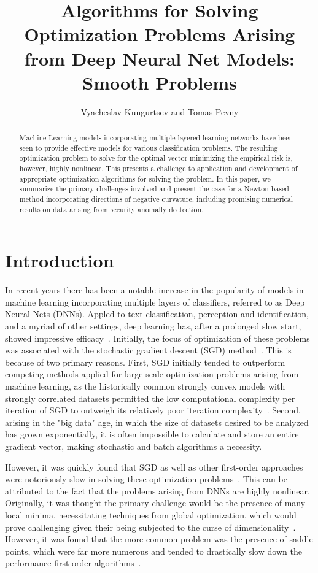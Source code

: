 \documentclass[psamsfonts,onesided,10pt]{amsart}
\title{Algorithms for Solving Optimization Problems Arising from Deep Neural Net Models: Smooth Problems}
\author{Vyacheslav Kungurtsev and Tomas Pevny}
\theoremstyle{definition}
\theoremstyle{remark}
\numberwithin{equation}{section}
\begin{document}
\maketitle


\begin{abstract}
Machine Learning models incorporating multiple layered learning networks have been seen to provide effective
models for various classification problems. The resulting optimization problem to solve for the optimal vector
minimizing the empirical risk is, however, highly nonlinear. This presents a challenge to application and development
of appropriate optimization algorithms for solving the problem. In this paper, we summarize the primary challenges
involved and present the case for a Newton-based method incorporating directions of negative curvature, including
promising numerical results on data arising from security anomally deetection. 
\end{abstract}

\section{Introduction}
In recent years there has been a notable increase in the popularity of models in machine learning incorporating multiple 
layers of classifiers, referred to as Deep Neural Nets (DNNs). 
Appled to text classification, perception and identification, and a myriad of other settings, deep learning
has, after a prolonged slow start, showed impressive efficacy~\cite{lecun2015deep}. Initially, the focus of optimization of these
problems was associated with the stochastic gradient descent (SGD) method~\cite{robbins1951stochastic}. This is because of two primary reasons.
First, SGD initially tended to outperform competing methods applied for large scale optimization problems arising from machine learning, 
as the historically common strongly convex models with strongly correlated
datasets permitted the low computational complexity per iteration of SGD to outweigh its relatively poor iteration complexity~\cite{bottou2016optimization}.  
Second, arising in the "big data" age, in which the size of datasets desired to be analyzed has grown exponentially, it is often impossible to calculate
and store an entire gradient vector, making stochastic and batch algorithms a necessity. 

However, it was quickly found that SGD as well as other first-order approaches were notoriously slow in solving these optimization 
problems~\cite{glorot2010understanding}. This can be attributed to the fact that the problems arising from DNNs are highly nonlinear. 
Originally, it was thought the primary challenge would be the presence of many local minima, necessitating techniques from global optimization,
which would prove challenging given their being subjected to the curse of dimensionality~\cite{zhigljavsky2007stochastic}. 
However, it was found that the more common
problem was the presence of saddle points, which were far more numerous and tended to drastically slow down the
performance first order algorithms~\cite{dauphin2014identifying}.
\end{document}
